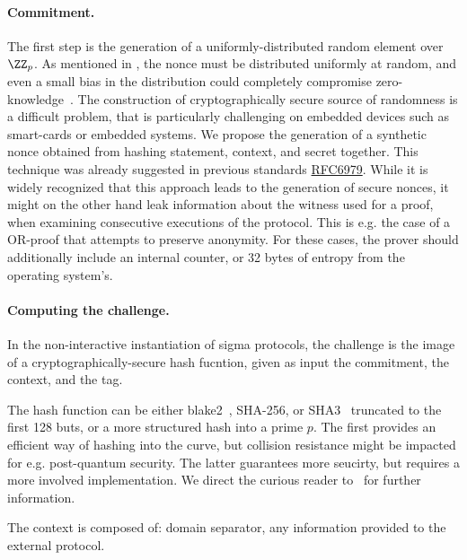 \documentclass[runningheads]{llncs}
\begin{document}

\paragraph{Commitment.} The first step is the generation of a uniformly-distributed random element over $\ZZ_p$. As mentioned in , the nonce must be distributed uniformly at random, and even a small bias in the distribution could completely compromise zero-knowledge~\cite{XX}.
The construction of cryptographically secure source of randomness is a difficult problem, that is particularly challenging on embedded devices such as smart-cards or embedded systems.
We propose the generation of a synthetic nonce obtained from hashing statement, context, and secret together.
This technique was already suggested in previous standards \href{https://tools.ietf.org/html/rfc6979}{RFC6979}.
While it is widely recognized that this approach leads to the generation of secure nonces, it might on the other hand leak information about the witness used for a proof, when examining consecutive executions of the protocol. This is e.g. the case of a OR-proof that attempts to preserve anonymity.
 For these cases, the prover should additionally include an internal counter, or 32 bytes of entropy from the operating system's.


\paragraph{Computing the challenge.} In the non-interactive instantiation of sigma protocols, the challenge is the image of a cryptographically-secure hash fucntion,
given as input the commitment, the context, and the tag.

The hash function can be either blake2~\cite{XX}, SHA-256, or SHA3~\cite{XX} truncated to the first 128 buts, or a more structured hash into a prime $p$.
The first provides an efficient way of hashing into the curve, but collision resistance might be impacted for e.g. post-quantum security.
The latter guarantees more seucirty, but requires a more involved implementation.
We direct the curious reader to~\cite{XX} for further information.

The context is composed of: domain separator, any information provided to the external protocol.
\end{document}
